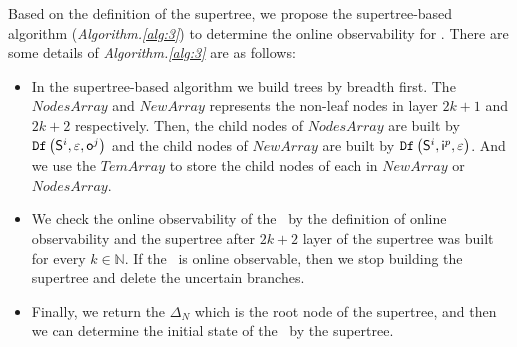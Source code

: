 Based on the definition of the supertree, we propose the supertree-based algorithm ({\em Algorithm.\ref{alg:3}}) to determine the online observability for \BCNs. There are some details of {\em Algorithm.\ref{alg:3}} are as follows:
\begin{itemize}
\item In the supertree-based algorithm we build trees by breadth first. The $NodesArray$ and $NewArray$ represents the non-leaf nodes in layer $2k+1$ and $2k+2$ respectively. Then, the child nodes of $NodesArray$ are built by ${\tt Df}\left(\mathsf{S}^i,\varepsilon, \mathsf{o}^j\right)$ and the child nodes of $NewArray$ are built by ${\tt Df}\left(\mathsf{S}^i,\mathsf{i}^p,\varepsilon\right)$. And we use the $TemArray$ to store the child nodes of each in $NewArray$ or $NodesArray$.
\item We check the online observability of the \BCN\ by the definition of online observability and the supertree after $2k+2$ layer of the supertree was built for every $k\in  \mathbb{N}$. If the \BCN\ is online observable, then we stop building the supertree and delete the uncertain branches. 
\item Finally, we return the $\Delta_N$ which is the root node of the supertree, and then we can determine the initial state of the \BCN\ by the supertree.
 \end{itemize}
